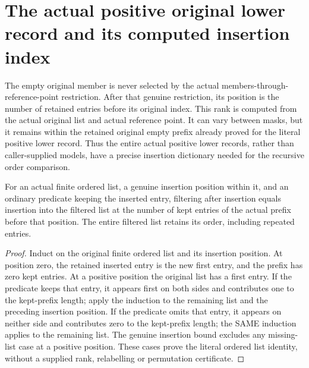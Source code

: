 \section{The actual positive original lower record and its computed insertion index}
The empty original member is never selected by the actual members-through-reference-point restriction. After that genuine restriction, its position is the number of retained entries before its original index. This rank is computed from the actual original list and actual reference point. It can vary between masks, but it remains within the retained original empty prefix already proved for the literal positive lower record. Thus the entire actual positive lower records, rather than caller-supplied models, have a precise insertion dictionary needed for the recursive order comparison.

\begin{lemma}
\label{hir:positive-member-empty-filter}
\leanok
For an actual finite ordered list, a genuine insertion position within it, and an ordinary predicate keeping the inserted entry, filtering after insertion equals insertion into the filtered list at the number of kept entries of the actual prefix before that position. The entire filtered list retains its order, including repeated entries.
\end{lemma}
\begin{proof}
Induct on the original finite ordered list and its insertion position. At position zero, the retained inserted entry is the new first entry, and the prefix has zero kept entries. At a positive position the original list has a first entry. If the predicate keeps that entry, it appears first on both sides and contributes one to the kept-prefix length; apply the induction to the remaining list and the preceding insertion position. If the predicate omits that entry, it appears on neither side and contributes zero to the kept-prefix length; the SAME induction applies to the remaining list. The genuine insertion bound excludes any missing-list case at a positive position. These cases prove the literal ordered list identity, without a supplied rank, relabelling or permutation certificate.
\end{proof}

